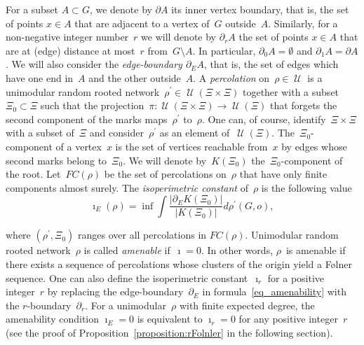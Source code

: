 \documentclass[english]{article}
\theoremstyle{definition}
\DeclareMathOperator{\U}{{\mathcal{U}}}
\begin{document}
For a subset $A\subset G $, we denote by $\partial A$ its inner vertex boundary, that is, the set of points $x \in A$ that are adjacent to a vertex of~$G$ outside~$A$. Similarly, for a non-negative integer number~$r$ we will denote by $\partial_r A$ the set of points $x \in A$ that are at (edge) distance at most~$r$ from~$G \setminus A$. In particular, $\partial_0 A = \emptyset$ and $\partial_1 A = \partial A$. We will also consider the \emph{edge-boundary $\partial_E A$}, that is, the set of edges which have one end in~$A$ and the other outside~$A$. 
A \emph{percolation} on~$\rho \in \U$ is a unimodular random rooted network~$\rho^\prime \in \U(\Xi \times\Xi)$ together with a subset $\Xi_0 \subset\Xi$ such that the projection~$\pi \colon \U(\Xi \times\Xi) \to \U(\Xi)$ that forgets the second component of the marks maps~$\rho^\prime$ to~$\rho$. One can, of course, identify~$\Xi \times\Xi$ with a subset of~$\Xi$ and consider~$\rho^\prime$ as an element of~$\U(\Xi)$.  The~$\Xi_0$-component of a vertex~$x$ is the set of vertices reachable from~$x$ by edges whose second marks belong to~$\Xi_0$. We will denote by~$K(\Xi_0)$ the~$\Xi_0$-component of the root. Let~$FC(\rho)$ be the set of percolations on~$\rho$ that have only finite components almost surely. The \emph{isoperimetric constant} of~$\rho$ is the following value 
\begin{equation}\label{eq_amenability}
\imath_E(\rho) = \inf \int\frac{|\partial_E K(\Xi_0)|}{|K(\Xi_0)|} d \rho^\prime(G,o), 
\end{equation}

where $(\rho^\prime, \Xi_0)$ ranges over all percolations in $FC(\rho)$. Unimodular random rooted network~$\rho$ is called \emph{amenable} if~$\imath = 0$. In other words, $\rho$~is amenable if there exists a sequence of percolations whose clusters of the origin yield a F\o lner sequence.
One can also define the isoperimetric constant~$\imath_r$ for a positive integer~$r$ by replacing the edge-boundary~$\partial_E$ in formula~\eqref{eq_amenability} with the $r$-boundary~$\partial_r$. For a unimodular~$\rho$ with finite expected degree, the amenability condition $\imath_E = 0$ is equivalent to $\imath_r = 0$ for any positive integer~$r$ (see the proof of Proposition~\ref{proposition:rFolnler} in the following section).
\end{document}
